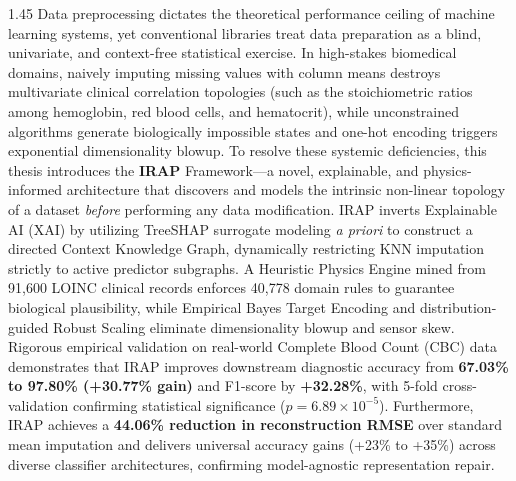\documentclass[MTech]{ugthesis}
\begin{document}
\pagebreak
\abstract
\begin{spacing}{1.45}
\normalfont
Data preprocessing dictates the theoretical performance ceiling of machine learning systems, yet conventional libraries treat data preparation as a blind, univariate, and context-free statistical exercise. In high-stakes biomedical domains, naively imputing missing values with column means destroys multivariate clinical correlation topologies (such as the stoichiometric ratios among hemoglobin, red blood cells, and hematocrit), while unconstrained algorithms generate biologically impossible states and one-hot encoding triggers exponential dimensionality blowup. To resolve these systemic deficiencies, this thesis introduces the \textbf{\ac{IRAP}} Framework—a novel, explainable, and physics-informed architecture that discovers and models the intrinsic non-linear topology of a dataset \textit{before} performing any data modification. IRAP inverts Explainable AI (\ac{XAI}) by utilizing Tree\ac{SHAP} surrogate modeling \textit{a priori} to construct a directed Context Knowledge Graph, dynamically restricting \ac{KNN} imputation strictly to active predictor subgraphs. A Heuristic Physics Engine mined from 91,600 \ac{LOINC} clinical records enforces 40,778 domain rules to guarantee biological plausibility, while Empirical Bayes Target Encoding and distribution-guided Robust Scaling eliminate dimensionality blowup and sensor skew. Rigorous empirical validation on real-world Complete Blood Count (\ac{CBC}) data demonstrates that IRAP improves downstream diagnostic accuracy from \textbf{67.03\% to 97.80\% (+30.77\% gain)} and F1-score by \textbf{+32.28\%}, with 5-fold cross-validation confirming statistical significance ($p = 6.89 \times 10^{-5}$). Furthermore, IRAP achieves a \textbf{44.06\% reduction in reconstruction RMSE} over standard mean imputation and delivers universal accuracy gains (+23\% to +35\%) across diverse classifier architectures, confirming model-agnostic representation repair.
\end{spacing}

\pagebreak
\begin{singlespace}
\tableofcontents
\thispagestyle{empty}

\listoftables
{}
\listoffigures
{}
\end{singlespace}
\end{document}
